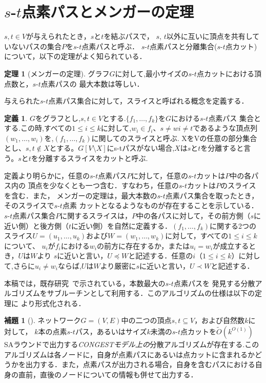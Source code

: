 \documentclass{thesis}
\theoremstyle{definition}
\newtheorem{theorem}{定理}
\newtheorem{lemma}{補題}
\newtheorem{definition}{定義}
\begin{document}
\section{$s$-$t$点素パスとメンガーの定理}

$s, t \in V$が与えられたとき，$s$と$t$を結ぶパスで，
$s$, $t$以外に互いに頂点を共有していないパスの集合$P$を$s$-$t$点素パスと呼ぶ．
$s$-$t$点素パスと分離集合($s$-$t$点カット)について，以下の定理がよく知られている．

\begin{theorem}[メンガーの定理] \label{menger}
グラフ$G$に対して,最小サイズの$s$-$t$点カットにおける頂点数と，$s$-$t$点素パスの
最大本数は等しい．
\end{theorem}
与えられた$s$-$t$点素パス集合に対して，スライスと呼ばれる概念を定義する．
\begin{definition}
    $G$をグラフとし,$s,t\in V$とする.$\{f_1, \dots ,f_k\}$を$G$における$s$-$t$点素パス
    集合とする.この時,すべての$1\leq i\leq k$に対して,$w_i \in f_i$、$s \neq wi \neq t$であるような頂点列$(w_1, \dots ,w_i)$を,$(f_1, \dots ,f_k)$に関してのスライスと呼ぶ.
    XをVの任意の部分集合とし、$s,t \notin X$とする。$G[V\setminus X]$にs-tパスがない場合,$X$は$s$と$t$を分離すると言う。$s$と$t$を分離するスライスをカットと呼ぶ.
\end{definition}

定義より明らかに，任意の$s$-$t$点素パス$P$に対して，任意の$s$-$t$カットは$P$中の各パス内の
頂点を少なくとも一つ含む．すなわち，任意の$s$-$t$カットは$P$のスライスを含む．また，
メンガーの定理は，最大本数の$s$-$t$点素パス集合を取ったとき，そのスライスで$s$-$t$点素
カットとなるようなものが存在することを示している．
$s$-$t$点素パス集合$P$に関するスライスは，$P$中の各パスに対して，その前方側（$s$に近い側）と後方側（$t$に近い側）を自然に定義する．$(f_1, \dots ,f_k)$に関する2つのスライス$U=(u_1, \dots, u_k)$および$W=(w_1, \dots ,w_k)$に対して，すべての$1\leq i\leq k$について、
$u_i$が$f_i$における$w_i$の前方に存在するか，または$u_i=w_i$が成立するとき，$U$は$W$より
$s$に近いと言い，$U\preceq W$と記述する．任意の$i$（$1 \leq i \leq k$）に対して,さらに$u_i \neq w_i$ならば,$U$は$W$より厳密に$s$に近いと言い，$U \prec W$と記述する．


本稿では，既存研究~\cite{li2018distributed}で示されている，本数最大の$s$-$t$点素パスを
発見する分散アルゴリズムをサブルーチンとして利用する．このアルゴリズムの仕様は以下の定理に
より形式化される．

\begin{lemma}[\cite{li2018distributed}] \label{path}
ネットワーク$G=(V,E)$中の二つの頂点$s,t\subseteq V$，および自然数$k$に対して，
$k$本の点素$s$-$t$パス，あるいはサイズ$k$未満の$s$-$t$点カットを$\tilde{O}(k^{O(1)})$
SAラウンドで出力する\textit{CONGESTモデル上の}分散アルゴリズムが存在する.このアルゴリズムは各ノードに，自身が点素パスにあるいは点カットに含まれるかどうかを出力する．また，点素パスが出力される場合，自身を含むパスにおける自身の直前，直後のノードについての情報も併せて出力する．
\end{lemma}
\end{document}
